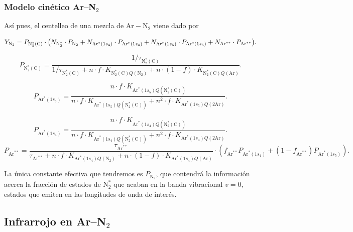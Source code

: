 \documentclass[12pt,a4paper]{article}
\newcommand{\N}{\mathrm{N}}
\newcommand{\Ar}{\mathrm{Ar}}
\newcommand{\NC}{\mathrm{N}_2^*(\mathrm{C})}
\DeclareRobustCommand{\ArOneSFour}{\ensuremath{\mathrm{Ar}^*(1s_4)}}
\DeclareRobustCommand{\ArOneSFive}{\ensuremath{\mathrm{Ar}^*(1s_5)}}
\begin{document}
\subsubsection{Modelo cinético Ar--N$_2$} \label{subsubsec:modelkinArN2}

Así pues, el centelleo de una mezcla de $\Ar-\N_2$ viene dado por

\begin{equation}
    Y_{\N_2}
    =
    P_{\NC}
    \cdot
    \pqty{
      N_{\N_2^*}\cdot P_{\N_2}
      +
      N_{\ArOneSFour}\cdot P_{\ArOneSFour}
      +
      N_{\ArOneSFive}\cdot P_{\ArOneSFive} +
      N_{\Ar^{**}}\cdot P_{\Ar^{**}}
    }. \label{eq:YuvN2}
\end{equation} 

\begin{equation}
    P_{\NC}
    =
    \frac{1/\tau_{\NC}}{
    1/\tau_{\NC}
    +
    n \cdot f \cdot K_{\NC Q(\N_2)}
    +
    n \cdot (1-f) \cdot K_{\NC Q(\Ar)}}.
\end{equation}

\begin{equation}
    P_{\ArOneSFive}
    =
    \frac{n \cdot f \cdot K_{\ArOneSFive Q(\NC)}}{
    n \cdot f \cdot K_{\ArOneSFive Q(\NC)}
    +
    n^2 \cdot f \cdot K_{\ArOneSFive Q(2\Ar)}}.
\end{equation}

\begin{equation}
    P_{\ArOneSFour}
    =
    \frac{n \cdot f \cdot K_{\ArOneSFour Q(\NC)}}{
    n \cdot f \cdot K_{\ArOneSFour Q(\NC)}
    +
    n^2 \cdot f \cdot K_{\ArOneSFour Q(2\Ar)}}.
\end{equation} 
\begin{equation*}
    P_{\Ar^{**}}
    =
    \frac{\tau_{\Ar^{**}}}{\tau_{\Ar^{**}} + 
    n \cdot f \cdot K_{\ArOneSFour Q(\N_2)}
    +
    n \cdot (1-f) \cdot K_{\ArOneSFour Q(\Ar)}} \cdot (f_{\Ar^{**}} P_{\ArOneSFour} + (1-f_{\Ar^{**}}) P_{\ArOneSFive}) . 
\end{equation*}

La única constante efectiva que tendremos es $P_{\N_2}$, que contendrá la información acerca la fracción de estados de $\N_2^*$ que acaban en la banda vibracional $v=0$, estados  que emiten en las longitudes de onda de interés.

\subsection{Infrarrojo en Ar--N$_2$} \label{subbsec:kinArIR}
\end{document}
